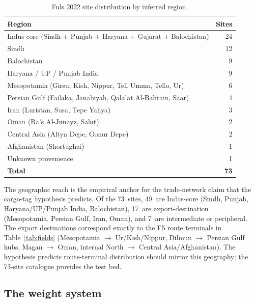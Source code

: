 \begin{longtable}{@{}lr@{}}
\caption{Fuls 2022 site distribution by inferred region.}
\label{tab:fuls-regions}\\
\toprule
Region & Sites \\
\midrule
\endfirsthead
\bottomrule
\endlastfoot
Indus core (Sindh + Punjab + Haryana + Gujarat + Balochistan) & 24 \\
\midrule
Sindh                                                          & 12 \\
\midrule
Balochistan                                                    & 9 \\
\midrule
Haryana / UP / Punjab India                                    & 9 \\
\midrule
Mesopotamia (Girsu, Kish, Nippur, Tell Umma, Tello, Ur)        & 6 \\
\midrule
Persian Gulf (Failaka, Janabiyah, Qala'at Al-Bahrain, Saar)    & 4 \\
\midrule
Iran (Luristan, Susa, Tepe Yahya)                              & 3 \\
\midrule
Oman (Ra's Al-Junayz, Salut)                                   & 2 \\
\midrule
Central Asia (Altyn Depe, Gonur Depe)                          & 2 \\
\midrule
Afghanistan (Shortughai)                                       & 1 \\
\midrule
Unknown provenience                                            & 1 \\
\midrule
\textbf{Total}                                                 & \textbf{73} \\
\end{longtable}

\noindent
The geographic reach is the empirical anchor for the trade-network
claim that the cargo-tag hypothesis predicts. Of the 73~sites,
49~are Indus-core (Sindh, Punjab, Haryana/UP/Punjab India,
Balochistan), 17~are export-destination (Mesopotamia, Persian Gulf,
Iran, Oman), and 7~are intermediate or peripheral. The export
destinations correspond exactly to the F5 route terminals in
Table~\ref{tab:fields} (Mesopotamia $\to$ Ur/Kish/Nippur, Dilmun
$\to$ Persian Gulf hubs, Magan $\to$ Oman, internal North $\to$
Central Asia/Afghanistan). The hypothesis predicts route-terminal
distribution should mirror this geography; the 73-site catalogue
provides the test bed.

\subsection{The weight system}

